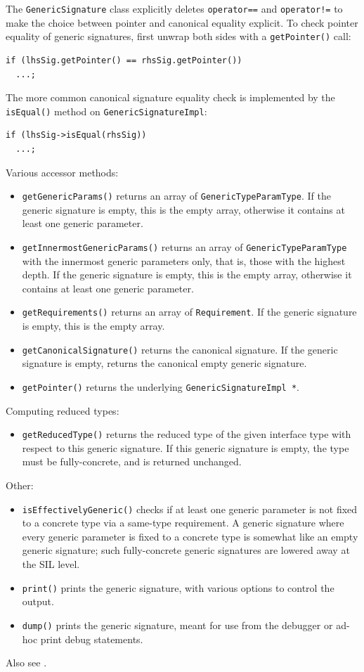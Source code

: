 \documentclass[../generics]{subfiles}
\begin{document}
The \texttt{GenericSignature} class explicitly deletes \texttt{operator==} and \texttt{operator!=} to make the choice between pointer and canonical equality explicit. To check pointer equality of generic signatures, first unwrap both sides with a \texttt{getPointer()} call:
\begin{Verbatim}
if (lhsSig.getPointer() == rhsSig.getPointer())
  ...;
\end{Verbatim}
The more common canonical signature equality check is implemented by the \texttt{isEqual()} method on \texttt{GenericSignatureImpl}:
\begin{Verbatim}
if (lhsSig->isEqual(rhsSig))
  ...;
\end{Verbatim}

Various accessor methods:
\begin{itemize}
\item \texttt{getGenericParams()} returns an array of \texttt{GenericTypeParamType}. If the generic signature is empty, this is the empty array, otherwise it contains at least one generic parameter.
\item \texttt{getInnermostGenericParams()} returns an array of \texttt{GenericTypeParamType} with the innermost generic parameters only, that is, those with the highest depth. If the generic signature is empty, this is the empty array, otherwise it contains at least one generic parameter.
\item \texttt{getRequirements()} returns an array of \texttt{Requirement}. If the generic signature is empty, this is the empty array.
\item \texttt{getCanonicalSignature()} returns the canonical signature. If the generic signature is empty, returns the canonical empty generic signature.
\item \texttt{getPointer()} returns the underlying \texttt{GenericSignatureImpl *}.
\end{itemize}
Computing reduced types:
\begin{itemize}
\item \texttt{getReducedType()} returns the reduced type of the given interface type with respect to this generic signature. If this generic signature is empty, the type must be fully-concrete, and is returned unchanged.
\end{itemize}
Other:
\begin{itemize}
\item \texttt{isEffectivelyGeneric()} checks if at least one generic parameter is not fixed to a concrete type via a same-type requirement. A generic signature where every generic parameter is fixed to a concrete type is somewhat like an empty generic signature; such fully-concrete generic signatures are lowered away at the SIL level.
\item \texttt{print()} prints the generic signature, with various options to control the output.
\item \texttt{dump()} prints the generic signature, meant for use from the debugger or ad-hoc print debug statements.
\end{itemize}
Also see .
\end{document}
